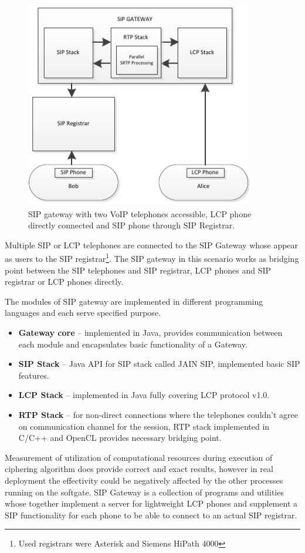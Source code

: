 \begin{figure}[H]
\centering
\includegraphics[width=10cm]{fig/scenario1.pdf}
\caption{SIP gateway with two VoIP telephones accessible, LCP phone directly 
connected and SIP phone through SIP Registrar.}
\label{oclpm}
\end{figure}

Multiple SIP or LCP telephones are connected to the SIP Gateway whose appear as
users to the SIP registrar\footnote{ Used registrars were Asterisk and Siemens 
HiPath 4000}. The SIP gateway in this scenario works as bridging point between 
the SIP telephones and SIP registrar, LCP phones and SIP registrar or LCP phones
directly.

The modules of SIP gateway are implemented in different programming languages
and each serve specified purpose.
\begin{itemize}
\item \textbf{Gateway core} -- implemented in Java, provides communication 
between each module and encapsulates basic functionality of a Gateway.
\item \textbf{SIP Stack} -- Java API for SIP stack called JAIN SIP\cite{jainsip}, 
implemented basic SIP features.
\item \textbf{LCP Stack} -- implemented in Java fully covering LCP protocol v1.0.
\item \textbf{RTP Stack} -- for non-direct connections where the telephones 
couldn't agree on communication channel for the session, RTP stack implemented in 
C/C++ and OpenCL provides necessary bridging point.
\end{itemize}

Measurement of utilization of computational resources during execution of 
ciphering algorithm does provide correct and exact results, however in real 
deployment the effectivity could be negatively affected by the other processes 
running on the softgate. SIP Gateway is a collection of programs and utilities
whose together implement a server for lightweight LCP phones and supplement a
SIP functionality for each phone to be able to connect to an actual SIP 
registrar. 

